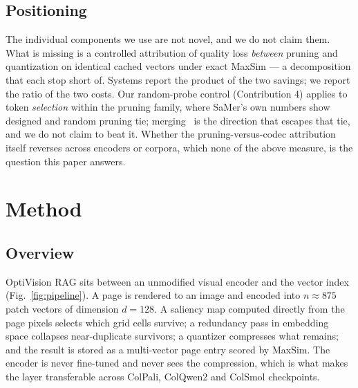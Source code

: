 \documentclass[conference]{IEEEtran}
\begin{document}
\subsection{Positioning}
The individual components we use are not novel, and we do not claim them.
What is missing is a controlled attribution of quality loss \emph{between}
pruning and quantization on identical cached vectors under exact MaxSim ---
a decomposition that
\cite{clavie2024pooling,crisp2025,hpccolpali2025} each stop short of. Systems
report the product of the two savings; we report the ratio of the two costs.
Our random-probe control (Contribution 4) applies to token \emph{selection}
within the pruning family, where SaMer's own numbers show designed and random
pruning tie; merging~\cite{samer2026,marginmerge2026,sculpting2026} is the
direction that escapes that tie, and we do not claim to beat it. Whether the
pruning-versus-codec attribution itself reverses across encoders or corpora,
which none of the above measure, is the question this paper answers.

\section{Method}

\subsection{Overview}
OptiVision RAG sits between an unmodified visual encoder and the vector index
(Fig.~\ref{fig:pipeline}). A page is rendered to an image and encoded into
$n \approx 875$ patch vectors of dimension $d=128$. A saliency map computed
directly from the page pixels selects which grid cells survive; a redundancy pass
in embedding space collapses near-duplicate survivors; a quantizer compresses
what remains; and the result is stored as a multi-vector page entry scored by
MaxSim. The encoder is never fine-tuned and never sees the compression, which is
what makes the layer transferable across ColPali, ColQwen2 and ColSmol
checkpoints.
\end{document}
